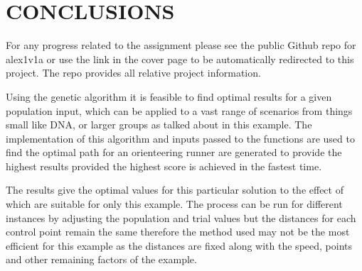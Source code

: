 \documentclass[a4paper, 10pt]{IEEEconf}
\begin{document}



\clearpage
\section{CONCLUSIONS}

For any progress related to the assignment please see the public Github repo for alex1v1a or use the link in the cover page to be automatically redirected to this project. The repo provides all relative project information.

Using the genetic algorithm it is feasible to find optimal results for a given population input, which can be applied to a vast range of scenarios from things small like DNA, or larger groups as talked about in this example. The implementation of this algorithm and inputs passed to the functions are used to find the optimal path for an orienteering runner are generated to provide the highest results provided the highest score is achieved in the fastest time. 

The results give the optimal values for this particular solution to the effect of which are suitable for only this example. The process can be run for different instances by adjusting the population and trial values but the distances for each control point remain the same therefore the method used may not be the most efficient for this example as the distances are fixed along with the speed, points and other remaining factors of the example.               


%
%

\end{document}
